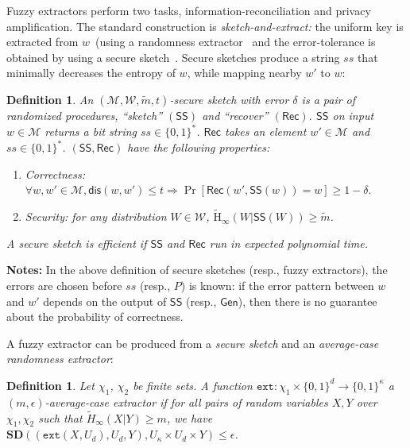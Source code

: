 \documentclass[11pt]{article}
\newcommand{\class}[1]{{\ensuremath{\mathsf{#1}}}}
\newcommand{\gen}{\ensuremath{\class{Gen}}\xspace}
\newcommand{\sketch}{\ensuremath{\class{SS}}\xspace}
\newcommand{\rec}{\ensuremath{\class{Rec}}\xspace}
\newcommand{\dis}{\ensuremath{\mathsf{dis}}}
\newcommand{\Hav}{\tilde{\mathrm{H}}_\infty}
\newcommand{\ext}{\ensuremath{\mathtt{ext}}}
\newcommand{\sd}{\ensuremath{\mathbf{SD}}}
\newtheorem{definition}[theorem]{Definition}
\begin{document}
\noindent
Fuzzy extractors perform two tasks, information-reconciliation and privacy amplification.  The standard construction is \emph{sketch-and-extract:} the uniform key is extracted from $w$~(using a randomness extractor~\cite{nisan1993randomness} and the error-tolerance is obtained by using a secure sketch~\cite[Lemma 4.1]{DBLP:journals/siamcomp/DodisORS08}.  Secure sketches produce a string $ss$ that minimally decreases the entropy of $w$, while mapping nearby $w'$ to $w$:
\begin{definition}
\label{def:secure sketch}
An $(\mathcal{M},\mathcal{W}, \tilde{m}, t)$-\emph{secure sketch} with error $\delta$ is a pair of randomized procedures, ``sketch'' $(\sketch)$ and ``recover'' $(\rec)$.  \sketch on input $w\in\mathcal{M}$ returns a bit string $ss\in\{0,1\}^*$.  \rec takes an element $w'\in\mathcal{M}$ and $ss\in\{0,1\}^*$.  $(\sketch, \rec)$ have the following properties:
\begin{enumerate}
\item \emph{Correctness}: $ \forall w, w'\in\mathcal{M}, \dis(w,w')\leq t \Rightarrow \Pr[\rec(w',\sketch(w))=w]\geq 1-\delta.$
\item \emph{Security}: for any distribution $W\in\mathcal{W}$, $\Hav(W|\sketch(W))\geq \tilde{m}$.
\end{enumerate}
A secure sketch is \emph{efficient} if \sketch and \rec run in expected polynomial time. 
\end{definition}

\noindent \textbf{Notes:} In the above definition of secure sketches (resp., fuzzy extractors), the errors are chosen before $ss$ (resp., $P$) is known: if the error pattern between $w$ and $w'$ depends on the output of $\sketch$ (resp., $\gen$), then there is no guarantee about the probability of correctness.  

A fuzzy extractor can be produced from a \emph{secure sketch} and an \emph{average-case randomness extractor}:

\begin{definition}
Let $\chi_1$, $\chi_2$ be finite sets.
A function $\ext: \chi_1\times \{0,1\}^d \rightarrow \{0,1\}^\kappa$ a \emph{$(m, \epsilon)$-average-case extractor} if for all pairs
of random variables $X, Y$ over $\chi_1, \chi_2$ such that
$\tilde{H}_\infty(X|Y) \ge m$, we have $\sd((\ext(X, U_d), U_d, Y), U_\kappa\times
U_d \times Y) \le \epsilon$.
\end{definition}
\end{document}
